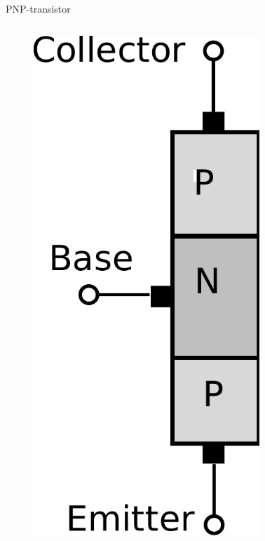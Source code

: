\documentclass[beamer]{standalone}
\begin{document}
\begin{frame}
\begin{columns}[t]
\begin{column}{.5\textwidth}
	\end{column}
	\begin{column}{.5\textwidth}
		PNP-transistor
		\begin{columns}[t]
			\begin{column}{.40\textwidth}
				\begin{figure}
					\includegraphics[width=0.80\textwidth]{./pics/pnp_transistor.pdf}
				\end{figure}
			\end{column}

\end{columns}
\end{column}
\end{columns}
\end{frame}
\end{document}
